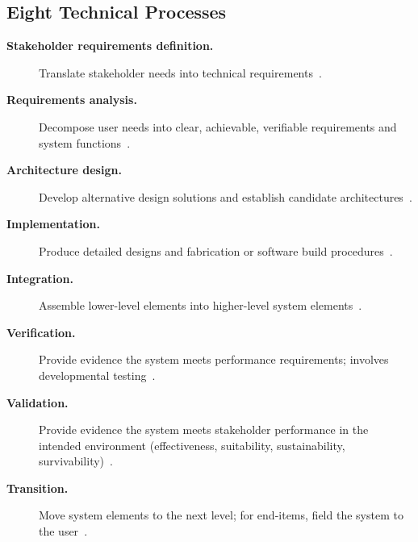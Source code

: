 \documentclass[../main.tex]{subfiles}
\begin{document}
\subsection{Eight Technical Processes}
\begin{description}
  \item[\textbf{Stakeholder requirements definition.}] Translate stakeholder needs into technical requirements~\autocite{edo-3-5-1-systems-engineering-overview-2025}.
  \item[\textbf{Requirements analysis.}] Decompose user needs into clear, achievable, verifiable requirements and system functions~\autocite{edo-3-5-1-systems-engineering-overview-2025}.
  \item[\textbf{Architecture design.}] Develop alternative design solutions and establish candidate architectures~\autocite{edo-3-5-1-systems-engineering-overview-2025}.
  \item[\textbf{Implementation.}] Produce detailed designs and fabrication or software build procedures~\autocite{edo-3-5-1-systems-engineering-overview-2025}.
  \item[\textbf{Integration.}] Assemble lower-level elements into higher-level system elements~\autocite{edo-3-5-1-systems-engineering-overview-2025}.
  \item[\textbf{Verification.}] Provide evidence the system meets performance requirements; involves developmental testing~\autocite{edo-3-5-1-systems-engineering-overview-2025}.
  \item[\textbf{Validation.}] Provide evidence the system meets stakeholder performance in the intended environment (effectiveness, suitability, sustainability, survivability)~\autocite{edo-3-5-1-systems-engineering-overview-2025}.
  \item[\textbf{Transition.}] Move system elements to the next level; for end-items, field the system to the user~\autocite{edo-3-5-1-systems-engineering-overview-2025}.
\end{description}
\end{document}
